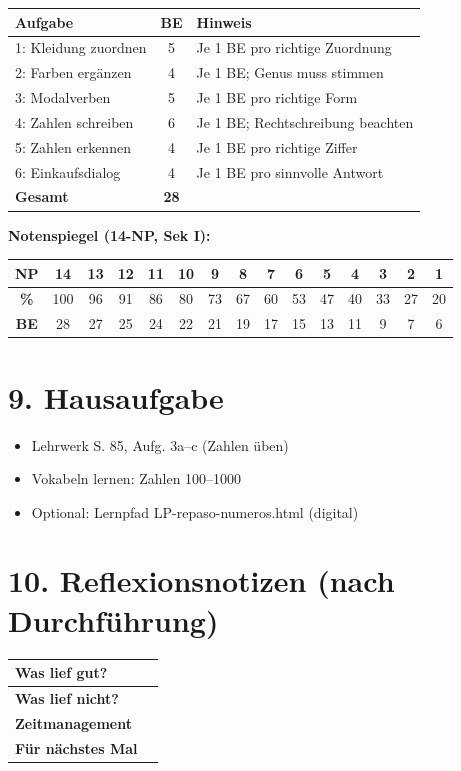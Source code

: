 \documentclass[11pt, a4paper]{article}
\begin{document}
\begin{tabularx}{\textwidth}{|l|c|X|}
\hline
\textbf{Aufgabe} & \textbf{BE} & \textbf{Hinweis} \\
\hline
1: Kleidung zuordnen & 5 & Je 1 BE pro richtige Zuordnung \\
\hline
2: Farben ergänzen & 4 & Je 1 BE; Genus muss stimmen \\
\hline
3: Modalverben & 5 & Je 1 BE pro richtige Form \\
\hline
4: Zahlen schreiben & 6 & Je 1 BE; Rechtschreibung beachten \\
\hline
5: Zahlen erkennen & 4 & Je 1 BE pro richtige Ziffer \\
\hline
6: Einkaufsdialog & 4 & Je 1 BE pro sinnvolle Antwort \\
\hline
\textbf{Gesamt} & \textbf{28} & \\
\hline
\end{tabularx}

\vspace{0.8em}

\textbf{Notenspiegel (14-NP, Sek I):}

\begin{tabular}{|c|c|c|c|c|c|c|c|c|c|c|c|c|c|c|}
\hline
\textbf{NP} & 14 & 13 & 12 & 11 & 10 & 9 & 8 & 7 & 6 & 5 & 4 & 3 & 2 & 1 \\
\hline
\textbf{\%} & 100 & 96 & 91 & 86 & 80 & 73 & 67 & 60 & 53 & 47 & 40 & 33 & 27 & 20 \\
\hline
\textbf{BE} & 28 & 27 & 25 & 24 & 22 & 21 & 19 & 17 & 15 & 13 & 11 & 9 & 7 & 6 \\
\hline
\end{tabular}


\section*{9. Hausaufgabe}

\begin{itemize}[nosep]
    \item Lehrwerk S. 85, Aufg. 3a--c (Zahlen üben)
    \item Vokabeln lernen: Zahlen 100--1000
    \item Optional: Lernpfad LP-repaso-numeros.html (digital)
\end{itemize}


\section*{10. Reflexionsnotizen (nach Durchführung)}

\begin{tabularx}{\textwidth}{|l|X|}
\hline
\textbf{Was lief gut?} & \\[2em]
\hline
\textbf{Was lief nicht?} & \\[2em]
\hline
\textbf{Zeitmanagement} & \\[2em]
\hline
\textbf{Für nächstes Mal} & \\[2em]
\hline
\end{tabularx}
\end{document}
